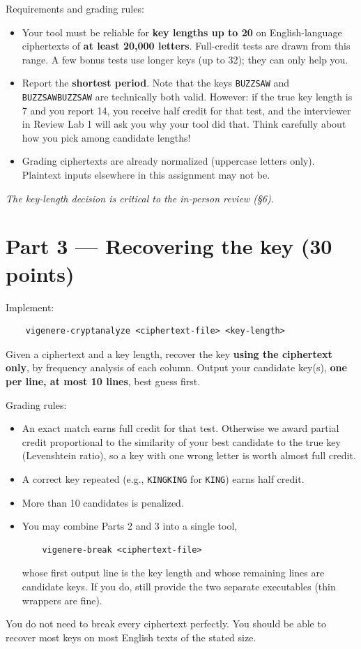 \documentclass[11pt]{article}
\newcommand{\code}[1]{\texttt{#1}}
\begin{document}
\medskip\noindent Requirements and grading rules:

\medskip \noindent

\begin{itemize}
\item Your tool must be reliable for \textbf{key lengths up to 20} on English-language ciphertexts of \textbf{at least 20,000 letters}. Full-credit tests are drawn from this range. A few bonus tests use longer keys (up to 32); they can only help you.
\item Report the \textbf{shortest period}. Note that the keys \code{BUZZSAW} and \code{BUZZSAWBUZZSAW} are technically both valid. However: if the true key length is 7 and you report 14, you receive half credit for that test, and the interviewer in Review Lab 1 will ask you why your tool did that. Think carefully about how you pick among candidate lengths!
\item Grading ciphertexts are already normalized (uppercase letters only). Plaintext inputs elsewhere in this assignment may not be.
\end{itemize}

\medskip \noindent
\emph{The key-length decision is critical to the in-person review (\S6).}

\section*{Part 3 --- Recovering the key (30 points)}

Implement:
\begin{verbatim}
    vigenere-cryptanalyze <ciphertext-file> <key-length>
\end{verbatim}
Given a ciphertext and a key length, recover the key \textbf{using the ciphertext only}, by frequency analysis of each column. Output your candidate key(s), \textbf{one per line, at most 10 lines}, best guess first.

\medskip\noindent Grading rules:

\medskip \noindent
\begin{itemize}
\item An exact match earns full credit for that test. Otherwise we award partial credit proportional to the similarity of your best candidate to the true key (Levenshtein ratio), so a key with one wrong letter is worth almost full credit.
\item A correct key repeated (e.g., \code{KINGKING} for \code{KING}) earns half credit.
\item More than 10 candidates is penalized. 
\item You may combine Parts 2 and 3 into a single tool,
\begin{verbatim}
    vigenere-break <ciphertext-file>
\end{verbatim}
whose first output line is the key length and whose remaining lines are candidate keys. If you do, still provide the two separate executables (thin wrappers are fine).
\end{itemize}
You do not need to break every ciphertext perfectly. You should be able to recover most keys on most English texts of the stated size.
\end{document}
